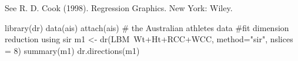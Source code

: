\begin{References}\relax
See R. D. Cook (1998).  Regression Graphics.  New York:  Wiley.
\end{References}
\begin{SeeAlso}\relax
{}
\end{SeeAlso}
\begin{Examples}
\begin{ExampleCode}
library(dr)
data(ais)
attach(ais)  # the Australian athletes data
#fit dimension reduction using sir
m1 <- dr(LBM~Wt+Ht+RCC+WCC, method="sir", nslices = 8)
summary(m1)
dr.directions(m1)
\end{ExampleCode}
\end{Examples}

